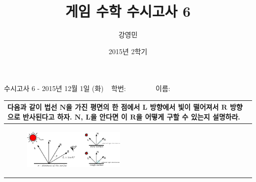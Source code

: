 \documentclass{beamer}
\title[게임수학 - 수시고사6]{ 게임 수학 수시고사 6}
\author{강영민}
\institute{동명대학교}
\date{2015년 2학기}
\begin{document}




\begin{frame}{\small 수시고사 6 - 2015년 12월 1일 (화) $~~$ 학번:$~~~~~~~~~~~~~~~~~~$                이름:  }

\begin{tabular}{|p{11cm}|} \hline
다음과 같이 법선 $\mathbf N$을 가진 평면의 한 점에서 $\mathbf L$ 방향에서 빛이 떨어져서 $\mathbf R$ 방향으로 반사된다고 하자.
$\mathbf N$, $\mathbf L$을 안다면 이 $\mathbf R$을 어떻게 구할 수 있는지 설명하라.
\\ \hline \hline
\begin{figure}
\includegraphics[width=5cm]{Math_lighting/specularConcept.eps}
\end{figure}
 \\ [20ex] \hline 
\end{tabular}

\end{frame}


\end{document}

